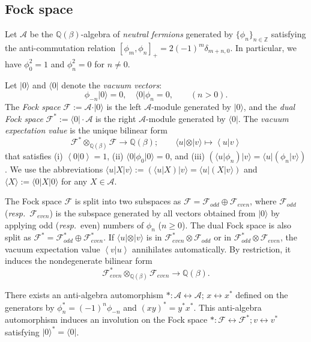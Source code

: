 \documentclass{amsart}
\def\QQ{\mathord{\mathbb{Q}}}
\def\ZZ{\mathord{\mathbb{Z}}}
\def\ket#1{\vert #1 \rangle}
\def\bra#1{\langle #1 \vert}
\def\inner#1#2{\left\langle #1|#2\right\rangle}
\begin{document}
\subsection{Fock space}\label{sec:Fock_space}

Let $\mathcal{A}$ be the $\QQ(\beta)$-algebra of \textit{neutral fermions} generated by $\{\phi_n\}_{n\in \ZZ}$ satisfying the anti-commutation relation
$
[\phi_m,\phi_n]_+=2(-1)^m\delta_{m+n,0}
$.
In particular, we have $\phi_0^2=1$ and $\phi_n^2=0$ for $n\neq 0$.

Let $\ket{0}$ and $\bra{0}$ denote the \textit{vacuum vectors}: 
\[
\phi_{-n}\ket{0}=0,\quad 
\bra{0}\phi_n=0,\qquad (n>0).
\]
The \textit{Fock space} $\mathcal{F}:=\mathcal{A}\cdot \ket{0}$ is the left $\mathcal{A}$-module generated by $\ket{0}$, and the \textit{dual Fock space}
$\mathcal{F}^\ast:=\bra{0}\cdot \mathcal{A}$ is the right $\mathcal{A}$-module generated by $\bra{0}$.
The \textit{vacuum expectation value} is the unique bilinear form
\[
\mathcal{F}^\ast \otimes_{\QQ(\beta)} \mathcal{F} \to \QQ(\beta);\qquad
\bra{u}\otimes \ket{v}\mapsto \inner{u}{v}
\]
that satisfies (i) $\inner{0}{0} =1$, (ii) $\bra{0}\phi_0\ket{0}=0$, and (iii)
$(\bra{u}\phi_n)\ket{v}=\bra{u}(\phi_n\ket{v})$.
We use the abbreviations 
$\bra{u}X\ket{v}:=(\bra{u}X)\ket{v}=\bra{u}(X\ket{v})$ and
$\langle X\rangle:=\bra{0}X\ket{0}$ for any $X\in \mathcal{A}$.

The Fock space $\mathcal{F}$ is split into two subspaces as $\mathcal{F}=\mathcal{F}_{odd}\oplus \mathcal{F}_{even}$, where $\mathcal{F}_{odd}$ (\textit{resp.}~$\mathcal{F}_{even}$) is the subspace generated by all vectors obtained from $\ket{0}$ by applying odd (\textit{resp.}~even) numbers of $\phi_n$ ($n\geq 0$).
The dual Fock space is also split as $\mathcal{F}^\ast=\mathcal{F}^\ast_{odd}\oplus \mathcal{F}^\ast_{even}$.
If
$\bra{u}\otimes \ket{v}$ is in $ \mathcal{F}^\ast_{even}\otimes \mathcal{F}_{odd}$ or in $\mathcal{F}^\ast_{odd}\otimes \mathcal{F}_{even}$, the vacuum expectation value $\inner{v}{u}$ annihilates automatically.
By restriction, it induces the nondegenerate bilinear form
\begin{equation}\label{eq:even_bilin}
\mathcal{F}_{even}^\ast\otimes_{\QQ(\beta)} \mathcal{F}_{even}\to \QQ(\beta).
\end{equation}


There exists an anti-algebra automorphism $\ast:\mathcal{A}\leftrightarrow\mathcal{A}$; $x\leftrightarrow x^\ast$ defined on the generators by $\phi_n^\ast=(-1)^n\phi_{-n}$ and $(xy)^\ast=y^\ast x^\ast$.
This anti-algebra automorphism induces an involution on the Fock space $\ast:\mathcal{F}\leftrightarrow \mathcal{F}^\ast;v\leftrightarrow v^\ast$ satisfying $\ket{0}^\ast=\bra{0}$.
\end{document}
